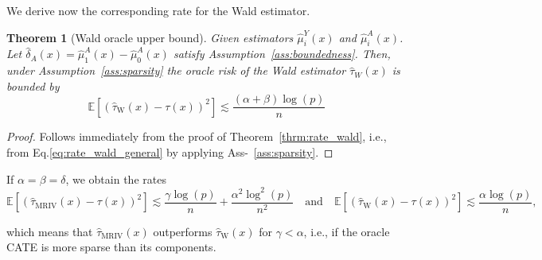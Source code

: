 \documentclass{article} %
\newcommand{\E}{\mathbb{E}}
\theoremstyle{definition}
\theoremstyle{plain}
\newtheorem{theorem}{Theorem}
\begin{document}
We derive now the corresponding rate for the Wald estimator.

\begin{theorem}[Wald oracle upper bound]\label{thrm:rate_wald_sparsity}
Given estimators $\hat{\mu}_i^Y(x)$ and $\hat{\mu}_i^A(x)$. Let $\hat{\delta}_A(x) = \hat{\mu}_1^A(x) - \hat{\mu}_0^A(x)$ satisfy Assumption~\ref{ass:boundedness}. Then, under Assumption~\ref{ass:sparsity} the oracle risk of the Wald estimator $\hat{\tau}_W(x)$ is bounded by
\begin{equation}\label{eq:upperbound_wald_sparsity}
    \E\left[(\hat{\tau}_{\mathrm{W}}(x) - \tau(x))^2\right] \lesssim  \frac{(\alpha + \beta) \log(p)}{n}
\end{equation}
\end{theorem}
\begin{proof}
Follows immediately from the proof of Theorem~\ref{thrm:rate_wald}, i.e., from Eq.\eqref{eq:rate_wald_general} by applying Ass-~\ref{ass:sparsity}.
\end{proof}

If $\alpha = \beta = \delta$, we obtain the rates
\begin{equation}
 \E\left[\left(\hat{\tau}_{\mathrm{MRIV}}(x) - \tau(x)\right)^2\right] \lesssim  \frac{\gamma \log(p)}{n} + \frac{\alpha^2 \log^2(p)}{n^2} \quad \text{and} \quad
        \E\left[(\hat{\tau}_{\mathrm{W}}(x) - \tau(x))^2\right] \lesssim  \frac{\alpha \log(p)}{n},
\end{equation}

which means that $\hat{\tau}_{\mathrm{MRIV}}(x)$ outperforms $\hat{\tau}_{\mathrm{W}}(x)$ for $\gamma < \alpha$, i.e., if the oracle CATE is more sparse than its components.

\clearpage
\end{document}
